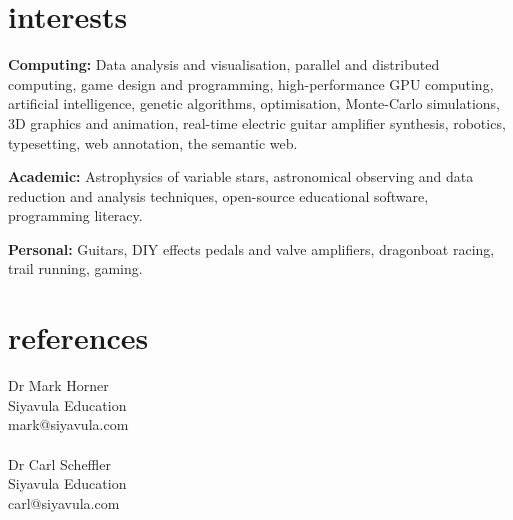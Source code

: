 \documentclass[]{friggeri-cv} %
\begin{document}






\section{interests}

\textbf{Computing:} Data analysis and visualisation, parallel and distributed computing, game design and programming, high-performance GPU computing, artificial intelligence, genetic algorithms, optimisation, Monte-Carlo simulations, 3D graphics and animation, real-time electric guitar amplifier synthesis, robotics, typesetting, web annotation, the semantic web.

\textbf{Academic:} Astrophysics of variable stars, astronomical observing and data reduction and analysis techniques, open-source educational software, programming literacy.

\textbf{Personal:} Guitars, DIY effects pedals and valve amplifiers, dragonboat racing, trail running, gaming.



\section{references}

Dr Mark Horner\\
Siyavula Education\\
mark@siyavula.com\\
\\
Dr Carl Scheffler\\
Siyavula Education\\
carl@siyavula.com\\
\end{document}
